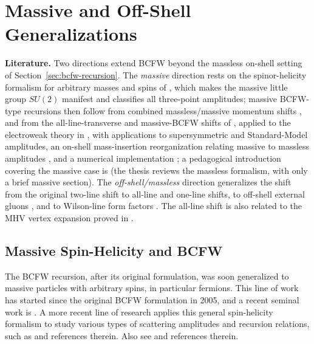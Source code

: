 \section{Massive and Off-Shell Generalizations}
\label{sec:massive-offshell-bcfw}

\textbf{Literature.} Two directions extend BCFW beyond the massless on-shell setting of Section~\ref{sec:bcfw-recursion}. The \emph{massive} direction rests on the spinor-helicity formalism for arbitrary masses and spins of \autocite{Arkani-Hamed:2017jhn}, which makes the massive little group $SU(2)$ manifest and classifies all three-point amplitudes; massive BCFW-type recursions then follow from combined massless/massive momentum shifts \autocite{Ballav:2020ese}, and from the all-line-transverse and massive-BCFW shifts of \autocite{Ema:2024vww}, applied to the electroweak theory in \autocite{Ema:2024rss}, with applications to supersymmetric \autocite{Abhishek:2022nqv} and Standard-Model \autocite{Christensen:2024bdt} amplitudes, an on-shell mass-insertion reorganization relating massive to massless amplitudes \autocite{Ni:2025xkg}, and a numerical implementation \autocite{Christensen:2024xsg}; a pedagogical introduction covering the massive case is \autocite{bognaScatteringAmplitudes} (the thesis \autocite{colwellDualitiesHelicity2017} reviews the massless formalism, with only a brief massive section). The \emph{off-shell/massless} direction generalizes the shift from the original two-line shift \autocite{Britto:2005fq} to all-line \autocite{Cohen:2010mi} and one-line \autocite{Cohen:2024xuf} shifts, to off-shell external gluons \autocite{vanHameren:2014iua}, and to Wilson-line form factors \autocite{Cohen:2024xuf}. The all-line shift is also related to the MHV vertex expansion proved in \autocite{Elvang:2008vz}. 

\subsection{Massive Spin-Helicity and BCFW}
\label{subsec:massive-spin-helicity-and-bcfw}

The BCFW recursion, after its original formulation, was soon generalized to massive particles with arbitrary spins, in particular fermions. This line of work has started since the original BCFW formulation in 2005, and a recent seminal work is \autocite{Arkani-Hamed:2017jhn}. 
A more recent line of research applies this general spin-helicity formalism to study various types of scattering amplitudes and recursion relations, such as \autocite{Abhishek:2022nqv} and references therein. Also see \autocite{Christensen:2024bdt, Ema:2024rss} and references therein.

